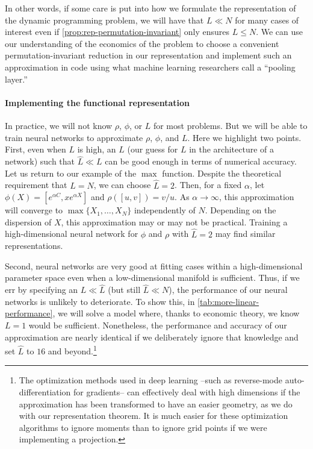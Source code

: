 \documentclass[12pt]{article}
\begin{document}
In other words, if some care is put into how we formulate the representation of the dynamic programming problem, we will have that $L \ll N$ for many cases of interest even if \cref{prop:rep-permutation-invariant} only ensures $L\leq N$. We can use our understanding of the economics of the problem to choose a convenient permutation-invariant reduction in our representation and implement such an approximation in code using what machine learning researchers call a ``pooling layer.''

\paragraph{Implementing the functional representation}

In practice, we will not know $\rho$, $\phi$, or $L$ for most problems. But we will be able to train neural networks to approximate $\rho$, $\phi$, and $L$. Here we highlight two points. First, even when $L$ is high, an $\widehat{L}$ (our guess for $L$ in the architecture of a network) such that $\widehat{L} \ll L$ can be good enough in terms of numerical accuracy. Let us return to our example of the $\max$ function. Despite the theoretical requirement that $L = N$, we can choose $\widehat{L} = 2$. Then, for a fixed $\alpha$, let $\phi(X) = [e^{\alpha C}, x e^{\alpha X}]$ and $\rho([u, v]) = v / u$.  As $\alpha \to \infty$, this approximation will converge to $\max\{X_1, \ldots, X_N\}$ independently of $N$. Depending on the dispersion of $X$, this approximation may or may not be practical. Training a high-dimensional neural network for $\phi$ and $\rho$ with $\widehat{L} = 2$ may find similar representations.

Second, neural networks are very good at fitting cases within a high-dimensional parameter space even when a low-dimensional manifold is sufficient. Thus, if we err by specifying an $L \ll \widehat{L}$ (but still $ \widehat{L} \ll N $), the performance of our neural networks is unlikely to deteriorate. To show this, in \cref{tab:more-linear-performance}, we will solve a model where, thanks to economic theory, we know $L=1$ would be sufficient. Nonetheless, the performance and accuracy of our approximation are nearly identical if we deliberately ignore that knowledge and set $\widehat{L}$ to $16$ and beyond.\footnote{The optimization methods used in deep learning --such as reverse-mode auto-differentiation for gradients-- can effectively deal with high dimensions if the approximation has been transformed to have an easier geometry, as we do with our representation theorem. It is much easier for these optimization algorithms to ignore moments than to ignore grid points if we were implementing a projection.}
\end{document}
